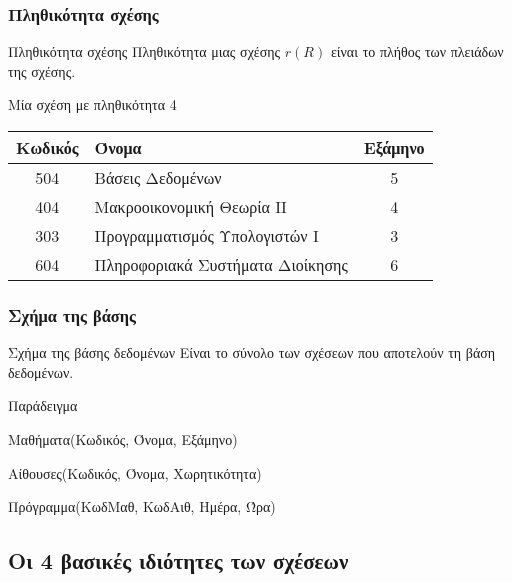 \begin{frame}
\frametitle{Πληθικότητα σχέσης}
\begin{minipage}{\wE}
  \begin{block}{Πληθικότητα σχέσης}
    Πληθικότητα μιας σχέσης $r(R)$ είναι το πλήθος των πλειάδων της σχέσης.
  \end{block}
  \pause
  \begin{exampleblock}{Μία σχέση με πληθικότητα 4}
    \begin{tabular}{ c l c } \toprule
        {\bf Κωδικός} & {\bf Όνομα} & {\bf Εξάμηνο} \\ \midrule
        504 & Βάσεις Δεδομένων & 5 \\
        404 & Μακροοικονομική Θεωρία ΙΙ & 4 \\
        303 & Προγραμματισμός Υπολογιστών Ι & 3 \\
        604 & Πληροφοριακά Συστήματα Διοίκησης & 6 \\ \bottomrule
    \end{tabular}    
  \end{exampleblock} 
\end{minipage}  
\end{frame}


\begin{frame}
\frametitle{Σχήμα της βάσης} 
\begin{minipage}{\wE}
  \begin{block}{Σχήμα της βάσης δεδομένων}
    Είναι το σύνολο των σχέσεων που αποτελούν τη βάση δεδομένων.
  \end{block}
    \pause
    \begin{exampleblock}{Παράδειγμα}
      \par Μαθήματα(Κωδικός, Όνομα, Εξάμηνο) \\ 
      \par \bigskip Αίθουσες(Κωδικός, Όνομα, Χωρητικότητα) \\
      \par \bigskip Πρόγραμμα(ΚωδΜαθ, ΚωδΑιθ, Ημέρα, Ώρα) \\
  \end{exampleblock}
\end{minipage}
\end{frame}



\subsection[\textgreek{Ιδιότητες}]{\textgreek{Οι 4 βασικές ιδιότητες των σχέσεων}}


